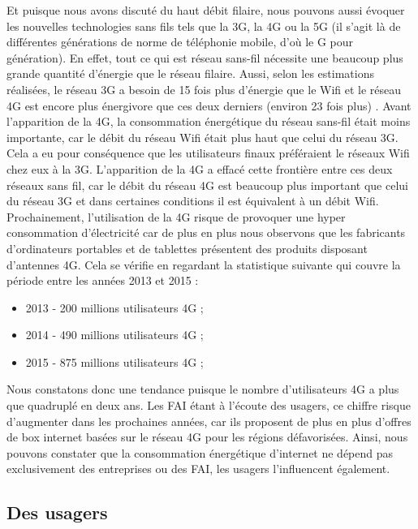 \documentclass[a4paper,twocolumn,12pt]{article}
\begin{document}
	Et puisque nous avons discuté du haut débit filaire, nous pouvons aussi évoquer les nouvelles technologies sans fils tels que la 3G, la 4G ou la 5G (il s'agit là de différentes générations de norme de téléphonie mobile, d'où le G pour génération). En effet, tout ce qui est réseau sans-fil nécessite une beaucoup plus grande quantité d'énergie que le réseau filaire. Aussi, selon les estimations réalisées, le réseau 3G a besoin de 15 fois plus d'énergie que le Wifi et le réseau 4G est encore plus énergivore que ces deux derniers (environ 23 fois plus) \cite{4}. Avant l’apparition de la 4G, la consommation énergétique du réseau sans-fil était moins importante, car le débit du réseau Wifi était plus haut que celui du réseau 3G. Cela a eu pour conséquence que les utilisateurs finaux préféraient le réseaux Wifi chez eux à la 3G. L’apparition de la 4G a effacé cette frontière entre ces deux réseaux sans fil, car le débit  du réseau 4G  est beaucoup plus important que celui du réseau 3G et dans certaines conditions il est équivalent à un débit Wifi. Prochainement, l’utilisation de la 4G risque de provoquer une hyper consommation d'électricité car de plus en plus nous observons que les fabricants d'ordinateurs portables et de tablettes présentent des produits disposant d’antennes 4G. Cela se vérifie en regardant la statistique suivante qui couvre la période entre les années 2013 et 2015 \cite{4} :
	
\begin{itemize}	
	\item 2013 - 200 millions utilisateurs 4G ;
	\item 2014 - 490 millions utilisateurs 4G ;
	\item 2015 - 875 millions utilisateurs 4G ;
\end{itemize}

	\indent Nous constatons donc une tendance puisque le nombre d’utilisateurs 4G a plus que quadruplé en deux ans. Les FAI étant à l'écoute des usagers, ce chiffre risque d’augmenter dans les prochaines années, car ils proposent de plus en plus d’offres de box internet basées sur le réseau 4G pour les régions défavorisées. Ainsi, nous pouvons constater que la consommation énergétique d’internet ne dépend pas exclusivement des entreprises ou des FAI, les usagers l’influencent également.


\subsection{Des usagers}
	
\end{document}
